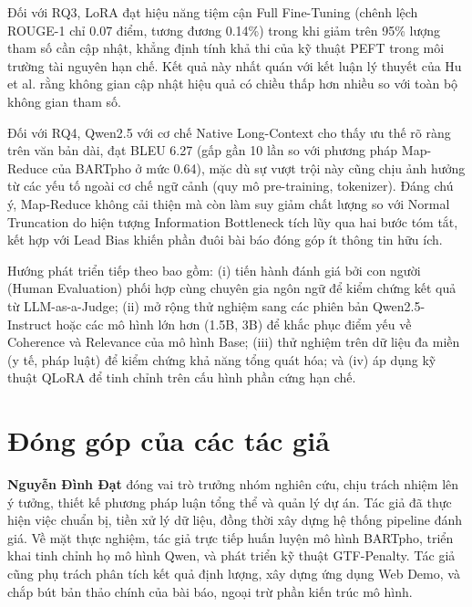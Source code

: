 \documentclass{article}
\begin{document}
Đối với RQ3, LoRA đạt hiệu năng tiệm cận Full Fine-Tuning (chênh lệch ROUGE-1 chỉ 0.07 điểm, tương đương 0.14\%) trong khi giảm trên 95\% lượng tham số cần cập nhật, khẳng định tính khả thi của kỹ thuật PEFT trong môi trường tài nguyên hạn chế. Kết quả này nhất quán với kết luận lý thuyết của Hu et al. \cite{lora} rằng không gian cập nhật hiệu quả có chiều thấp hơn nhiều so với toàn bộ không gian tham số.

Đối với RQ4, Qwen2.5 với cơ chế Native Long-Context cho thấy ưu thế rõ ràng trên văn bản dài, đạt BLEU 6.27 (gấp gần 10 lần so với phương pháp Map-Reduce của BARTpho ở mức 0.64), mặc dù sự vượt trội này cũng chịu ảnh hưởng từ các yếu tố ngoài cơ chế ngữ cảnh (quy mô pre-training, tokenizer). Đáng chú ý, Map-Reduce không cải thiện mà còn làm suy giảm chất lượng so với Normal Truncation do hiện tượng Information Bottleneck tích lũy qua hai bước tóm tắt, kết hợp với Lead Bias khiến phần đuôi bài báo đóng góp ít thông tin hữu ích.

Hướng phát triển tiếp theo bao gồm: (i) tiến hành đánh giá bởi con người (Human Evaluation) phối hợp cùng chuyên gia ngôn ngữ để kiểm chứng kết quả từ LLM-as-a-Judge; (ii) mở rộng thử nghiệm sang các phiên bản Qwen2.5-Instruct hoặc các mô hình lớn hơn (1.5B, 3B) để khắc phục điểm yếu về Coherence và Relevance của mô hình Base; (iii) thử nghiệm trên dữ liệu đa miền (y tế, pháp luật) để kiểm chứng khả năng tổng quát hóa; và (iv) áp dụng kỹ thuật QLoRA \cite{qlora} để tinh chỉnh trên cấu hình phần cứng hạn chế.

\section*{Đóng góp của các tác giả}

\textbf{Nguyễn Đình Đạt} đóng vai trò trưởng nhóm nghiên cứu, chịu trách nhiệm lên ý tưởng, thiết kế phương pháp luận tổng thể và quản lý dự án. Tác giả đã thực hiện việc chuẩn bị, tiền xử lý dữ liệu, đồng thời xây dựng hệ thống pipeline đánh giá. Về mặt thực nghiệm, tác giả trực tiếp huấn luyện mô hình BARTpho, triển khai tinh chỉnh họ mô hình Qwen, và phát triển kỹ thuật GTF-Penalty. Tác giả cũng phụ trách phân tích kết quả định lượng, xây dựng ứng dụng Web Demo, và chắp bút bản thảo chính của bài báo, ngoại trừ phần kiến trúc mô hình.
\end{document}

